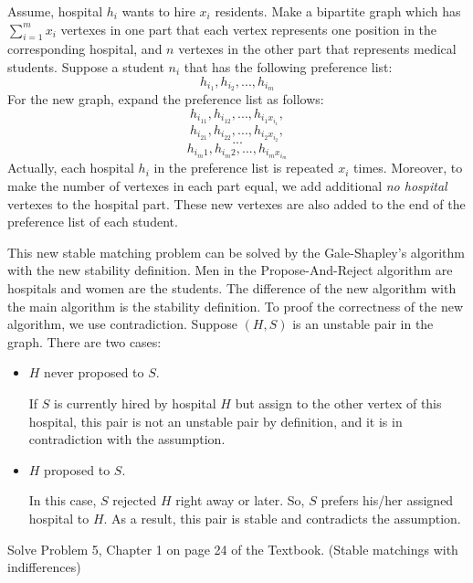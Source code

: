 \documentclass[12pt]{article}
\newenvironment{solution}[2][Solution]{\begin{trivlist}
\item[\hskip \labelsep {\bfseries #1}]}{\end{trivlist}}
\newenvironment{problem}[2][Problem]{\begin{trivlist}
\item[\hskip \labelsep {\bfseries #1}\hskip \labelsep {\bfseries #2.}]}{\end{trivlist}}
\begin{document}
\begin{solution}{}
Assume, hospital $h_i$ wants to hire $x_i$ residents. Make a bipartite graph
which has $\sum_{i=1}^{m} x_i$ vertexes in one part that each vertex represents one
position in the corresponding hospital, and $n$ vertexes in the other part that represents
medical students. Suppose a student $n_i$ that has the following preference list:
$${h_{i_1},h_{i_2},...,h_{i_m}}$$
For the new graph, expand the preference list as follows:
$${h_{i_11},h_{i_12},...,h_{i_1x_{i_1}}},$$
$${h_{i_21},h_{i_22},...,h_{i_2x_{i_2}}},$$
$$...$$
$${h_{i_m1},h_{i_m2},...,h_{i_mx_{i_m}}}$$
Actually, each hospital $h_i$ in the preference list is repeated $x_i$ times.
Moreover, to make the number of vertexes in each part equal, we add additional
\textit{no hospital} vertexes to the hospital part. These new vertexes are also
added to the end of the preference list of each student.

This new stable matching problem can be solved by the Gale-Shapley's algorithm 
with the new stability definition. Men in the Propose-And-Reject algorithm
are hospitals and women are the students. The difference of the new algorithm
with the main algorithm is the stability definition. To proof the correctness
of the new algorithm, we use contradiction. Suppose $(H,S)$ is an unstable pair in
the graph. There are two cases:
\begin{itemize}
\item $H$ never proposed to $S$.

If $S$ is currently hired by hospital $H$ but assign to the other vertex of this
hospital, this pair is not an unstable pair by definition, and it is in contradiction
with the assumption.

\item $H$ proposed to $S$.

In this case, $S$ rejected $H$ right away or later. So, $S$ prefers his/her assigned 
hospital to $H$. As a result, this pair is stable and contradicts the assumption.
\end{itemize}

\end{solution}



\begin{problem}{3}
Solve Problem 5, Chapter 1 on page 24 of the Textbook. (Stable matchings with indifferences)
\end{problem}
\end{document}
